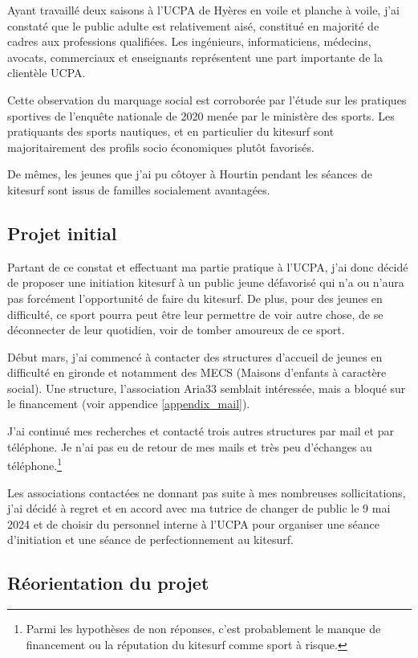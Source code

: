 \documentclass[11pt,a4paper]{report}
\begin{document}
Ayant travaillé deux saisons à l'UCPA de Hyères en voile
et planche à voile, j'ai  constaté que le public adulte est relativement
aisé, constitué en majorité de cadres aux professions qualifiées. Les
ingénieurs, informaticiens, médecins, avocats, commerciaux et enseignants
représentent une part importante de la clientèle UCPA.

Cette observation du marquage social  est corroborée par l'étude sur 
les pratiques sportives de l'enqu\^ete nationale de
2020 menée par le ministère des sports\cite{injep}. Les pratiquants
des sports nautiques, et en particulier du kitesurf sont majoritairement
des profils socio économiques plut\^ot favorisés.

De m\^emes, les jeunes que j'ai pu côtoyer à Hourtin
pendant les séances de kitesurf sont issus de
familles socialement avantagées.

\subsection{Projet initial}

Partant de ce constat et effectuant ma partie pratique à l'UCPA,
j'ai donc décidé de proposer une initiation kitesurf à un public jeune
défavorisé qui n'a ou n'aura pas forcément l'opportunité de faire du kitesurf. 
De plus, pour des jeunes en difficulté, ce sport pourra peut être 
leur permettre de voir autre chose, de se déconnecter de leur quotidien,
voir de tomber amoureux de ce sport.

Début mars, j'ai commencé à contacter des structures d'accueil de jeunes 
en difficulté en gironde et notamment des MECS (Maisons d'enfants à 
caractère social).
Une structure, l'association Aria33\cite{aria33} semblait 
intéressée, mais a bloqué sur le financement
(voir appendice \ref{appendix_mail}).

J'ai continué mes recherches et contacté trois autres structures
par mail et par téléphone. Je n'ai pas eu de retour de mes mails 
et très peu d'échanges au téléphone.\footnote{Parmi les hypothèses
de non réponses, c'est probablement le manque de financement ou
la réputation du kitesurf comme sport  à risque.}

Les associations contactées ne donnant pas  suite à mes nombreuses
sollicitations, j'ai décidé à regret et en accord avec ma tutrice
de changer de public le 9 mai 2024 et de choisir du personnel interne
à l'UCPA pour organiser une séance d'initiation et une séance de perfectionnement au kitesurf.

\subsection{Réorientation du projet\label{reorientation}}
\end{document}
